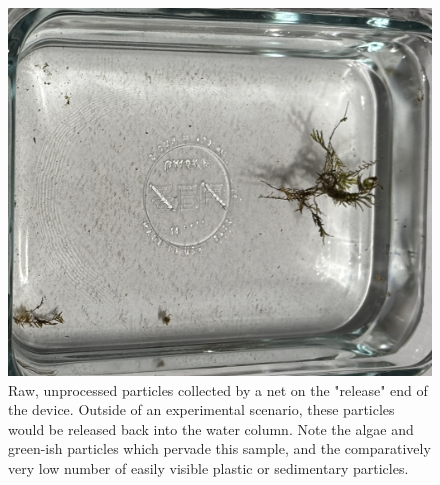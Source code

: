 \documentclass[fleqn,10pt]{SelfArx} %
\begin{document}
	\begin{figure}[h]
		\centering
		\includegraphics[angle=0,origin=c,width=1\linewidth]{Figures/RawReleased}
		\caption[Raw Released Particles]{Raw, unprocessed particles collected by a net on the "release" end of the device. Outside of an experimental scenario, these particles would be released back into the water column. Note the algae and green-ish particles which pervade this sample, and the comparatively very low number of easily visible plastic or sedimentary particles.}
		\label{fig:rawreleased}
	\end{figure}
	
\end{document}
